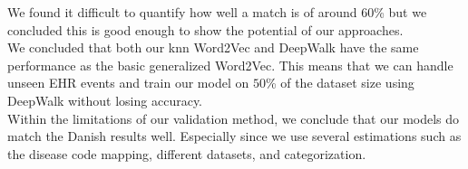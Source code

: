 We found it difficult to quantify how well a match is of around $60$\% but we concluded this is good enough to show the potential of our approaches. \\

We concluded that both our knn Word2Vec and DeepWalk have the same performance as the basic generalized Word2Vec. This means that we can handle unseen EHR events and train our model on $50$\% of the dataset size using DeepWalk without losing accuracy. \\

Within the limitations of our validation method, we conclude that our models do match the Danish results well. Especially since we use several estimations such as the disease code mapping, different datasets, and categorization. 



